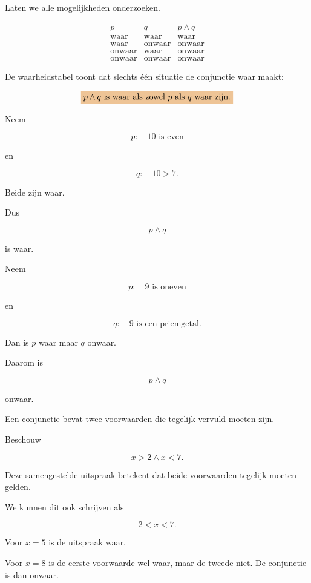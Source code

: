 \documentclass{ximera}
\begin{document}
  Laten we alle mogelijkheden onderzoeken.

  \[
  \begin{array}{c|c|c}
  p & q & p\land q\\
  \hline
  \text{waar} & \text{waar} & \text{waar}\\
  \text{waar} & \text{onwaar} & \text{onwaar}\\
  \text{onwaar} & \text{waar} & \text{onwaar}\\
  \text{onwaar} & \text{onwaar} & \text{onwaar}
  \end{array}
  \]


  De waarheidstabel toont dat slechts één situatie de conjunctie waar maakt:

  \[
  \important{
  p\land q\text{ is waar als zowel }p\text{ als }q\text{ waar zijn.}
  }
  \]


  \begin{voorbeeld}

  Neem

  \[
  p:\quad 10\text{ is even}
  \]

  en

  \[
  q:\quad 10>7.
  \]

  Beide zijn waar.

  Dus

  \[
  p\land q
  \]

  is waar.
  \end{voorbeeld}


  \begin{voorbeeld}

  Neem

  \[
  p:\quad 9\text{ is oneven}
  \]

  en

  \[
  q:\quad 9\text{ is een priemgetal}.
  \]

  Dan is $p$ waar maar $q$ onwaar.

  Daarom is

  \[
  p\land q
  \]

  onwaar.
  \end{voorbeeld}



  Een conjunctie bevat twee voorwaarden die tegelijk vervuld moeten zijn.


  \begin{voorbeeld}

  Beschouw

  \[
  x>2\land x<7.
  \]

  Deze samengestelde uitspraak betekent dat beide voorwaarden tegelijk
  moeten gelden.

  We kunnen dit ook schrijven als

  \[
  2<x<7.
  \]

  Voor $x=5$ is de uitspraak waar.

  Voor $x=8$ is de eerste voorwaarde wel waar, maar de tweede niet.
  De conjunctie is dan onwaar.
  \end{voorbeeld}
\end{document}
